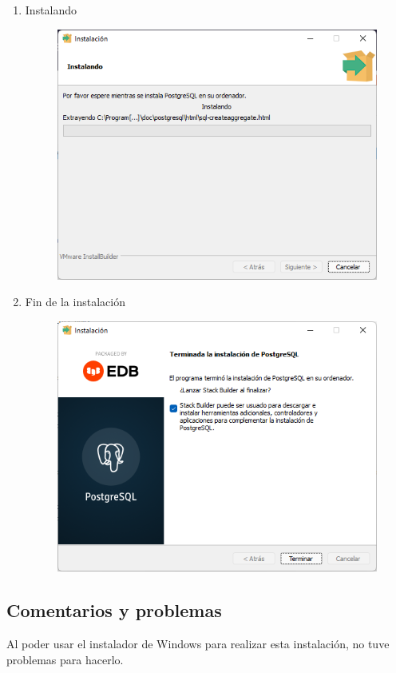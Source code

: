 \documentclass{exam}
\begin{document}
\begin{enumerate}
\begin{figure}[h]
        \end{figure}
        \newpage
        \item Instalando
        \begin{figure}[h]
            \centering
            \includegraphics[width = 10 cm]{imgSalazar/I_10.png}
        \end{figure}
        \item Fin de la instalación
        \begin{figure}[h]
            \centering
            \includegraphics[width = 10 cm]{imgSalazar/I_11.png}
        \end{figure}
        
    \end{enumerate}

\subsection*{Comentarios y problemas}

Al poder usar el instalador de Windows para realizar esta instalación, no tuve problemas para hacerlo.
\end{document}

